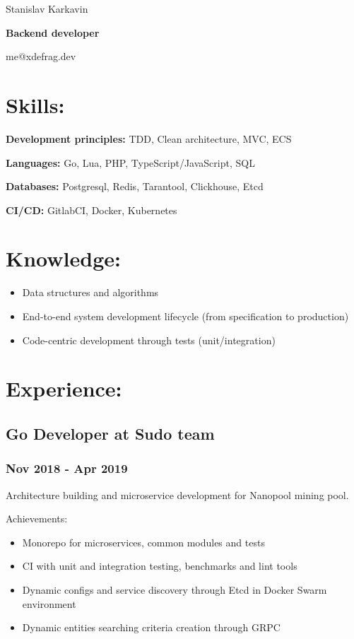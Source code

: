 \documentclass[letterpaper]{article}
\author{Stanislaw Karkavin}
\date{\today}
\title{}
\begin{document}
\begin{center}
Stanislav Karkavin

\textbf{\textbf{Backend developer}}

me@xdefrag.dev
\end{center}

\section{Skills:}
\label{sec:orgbb9cddb}
\textbf{\textbf{Development principles:}} TDD, Clean architecture, MVC, ECS

\textbf{\textbf{Languages:}} Go, Lua, PHP, TypeScript/JavaScript, SQL

\textbf{\textbf{Databases:}} Postgresql, Redis, Tarantool, Clickhouse, Etcd

\textbf{\textbf{CI/CD:}} GitlabCI, Docker, Kubernetes

\section{Knowledge:}
\label{sec:org386a5df}
\begin{itemize}
\item Data structures and algorithms
\item End-to-end system development lifecycle (from specification to production)
\item Code-centric development through tests (unit/integration)
\end{itemize}

\section{Experience:}
\label{sec:org1a19aeb}

\subsection{Go Developer at Sudo team}
\label{sec:org7cb4213}
\subsubsection{Nov 2018 - Apr 2019}
\label{sec:orga8c254f}
Architecture building and microservice development for Nanopool mining pool.

Achievements:
\begin{itemize}
\item Monorepo for microservices, common modules and tests
\item CI with unit and integration testing, benchmarks and lint tools
\item Dynamic configs and service discovery through Etcd in Docker Swarm environment
\item Dynamic entities searching criteria creation through GRPC
\end{itemize}
\end{document}
